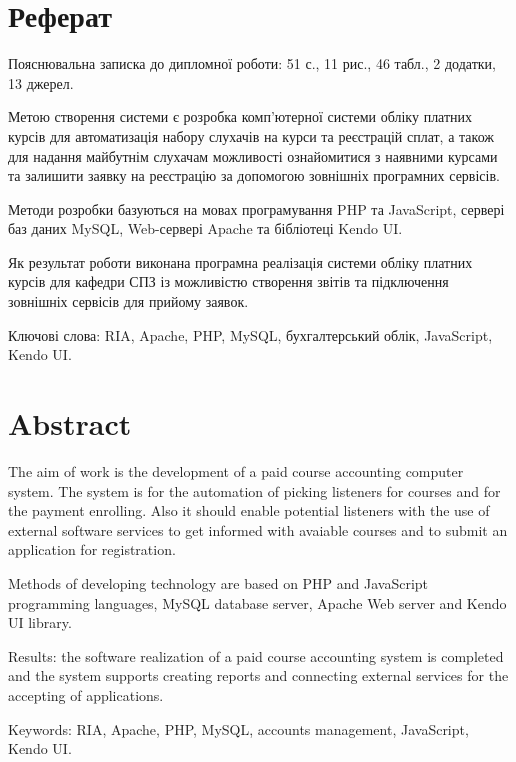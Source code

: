 \newpage
\section*{Реферат}
\bigbreak
Пояснювальна записка до дипломної роботи: 51 с., 11 рис., 46 табл., 2 додатки, 13 джерел.

Метою створення системи є розробка комп'ютерної системи обліку платних курсів для автоматизація набору слухачів на курси та реєстрацій сплат, а також для надання майбутнім слухачам можливості ознайомитися з наявними курсами та залишити заявку на реєстрацію за допомогою зовнішніх програмних сервісів.

Методи розробки базуються на мовах програмування PHP та JavaScript, сервері баз даних MySQL, Web-сервері Apache та бібліотеці Kendo UI.

Як результат роботи виконана програмна реалізація системи обліку платних курсів для кафедри СПЗ із можливістю створення звітів та підключення зовнішніх сервісів для прийому заявок.

Ключові слова: RIA, Apache, PHP, MySQL, бухгалтерський облік, JavaScript, Kendo UI.
\newpage
\section*{Abstract}
The aim of work is the development of a paid course accounting computer system. The system is for the automation of picking listeners for courses and for the payment enrolling. Also it should enable potential listeners with the use of external software services to get informed with avaiable courses and to submit an application for registration.

Methods of developing technology are based on PHP and JavaScript programming languages, MySQL database server, Apache Web server and Kendo UI library.

Results: the software realization of a paid course accounting system is completed and the system supports creating reports and connecting external services for the accepting of applications.

Keywords: RIA, Apache, PHP, MySQL, accounts management, JavaScript, Kendo UI.

